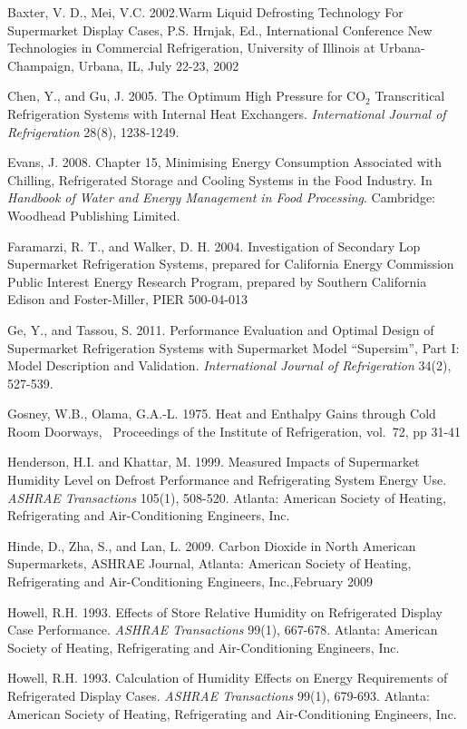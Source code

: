 Baxter, V. D., Mei, V.C. 2002.Warm Liquid Defrosting Technology For Supermarket Display Cases, P.S. Hrnjak, Ed., International Conference New Technologies in Commercial Refrigeration, University of Illinois at Urbana-Champaign, Urbana, IL, July 22-23, 2002

Chen, Y., and Gu, J. 2005. The Optimum High Pressure for CO\(_{2}\) Transcritical Refrigeration Systems with Internal Heat Exchangers. \emph{International Journal of Refrigeration} 28(8), 1238-1249.

Evans, J. 2008. Chapter 15, Minimising Energy Consumption Associated with Chilling, Refrigerated Storage and Cooling Systems in the Food Industry. In \emph{Handbook of Water and Energy Management in Food Processing}. Cambridge:~ Woodhead Publishing Limited.

Faramarzi, R. T., and Walker, D. H. 2004. Investigation of Secondary Lop Supermarket Refrigeration Systems, prepared for California Energy Commission Public Interest Energy Research Program, prepared by Southern California Edison and Foster-Miller, PIER 500-04-013

Ge, Y., and Tassou, S. 2011. Performance Evaluation and Optimal Design of Supermarket Refrigeration Systems with Supermarket Model ``Supersim'', Part I: Model Description and Validation. \emph{International Journal of Refrigeration} 34(2), 527-539.

Gosney, W.B., Olama, G.A.-L. 1975. Heat and Enthalpy Gains through Cold Room Doorways,~ Proceedings of the Institute of Refrigeration, vol.~72, pp 31-41

Henderson, H.I. and Khattar, M. 1999. Measured Impacts of Supermarket Humidity Level on Defrost Performance and Refrigerating System Energy Use. \emph{ASHRAE Transactions} 105(1), 508-520. Atlanta: American Society of Heating, Refrigerating and Air-Conditioning Engineers, Inc.

Hinde, D., Zha, S., and Lan, L. 2009. Carbon Dioxide in North American Supermarkets, ASHRAE Journal, Atlanta: American Society of Heating, Refrigerating and Air-Conditioning Engineers, Inc.,February 2009

Howell, R.H. 1993. Effects of Store Relative Humidity on Refrigerated Display Case Performance. \emph{ASHRAE Transactions} 99(1), 667-678. Atlanta: American Society of Heating, Refrigerating and Air-Conditioning Engineers, Inc.

Howell, R.H. 1993. Calculation of Humidity Effects on Energy Requirements of Refrigerated Display Cases. \emph{ASHRAE Transactions} 99(1), 679-693. Atlanta: American Society of Heating, Refrigerating and Air-Conditioning Engineers, Inc.

